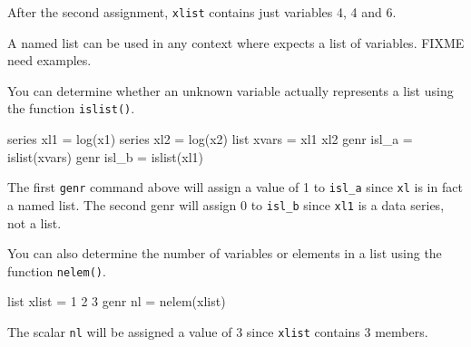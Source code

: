 After the second assignment, \texttt{xlist} contains just variables 4,
4 and 6.  

A named list can be used in any context where  expects a
list of variables.  FIXME need examples.

You can determine whether an unknown variable actually represents a list
using the function \texttt{islist()}.

\begin{code}
series xl1 = log(x1)
series xl2 = log(x2)
list xvars = xl1 xl2
genr isl_a = islist(xvars)
genr isl_b = islist(xl1)
\end{code}

The first \texttt{genr} command above will assign a value of 1 to
\texttt{isl\_a} since \texttt{xl} is in fact a named list.  The second
genr will assign 0 to \texttt{isl\_b} since \texttt{xl1} is a data
series, not a list.  

You can also determine the number of variables or elements in a list
using the function \texttt{nelem()}.

\begin{code}
list xlist = 1 2 3
genr nl = nelem(xlist)
\end{code}

The scalar \texttt{nl} will be assigned a value of 3 since
\texttt{xlist} contains 3 members.






    

